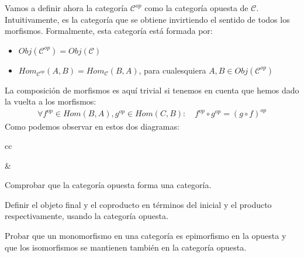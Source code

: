 \documentclass[11pt, fleqn, spanish]{book}
\newcommand{\C}{\mathcal{C} }
\begin{document}
  Vamos a definir ahora la categoría $\C^{op}$ como la categoría opuesta de $\C$. Intuitivamente,
  es la categoría que se obtiene invirtiendo el sentido de todos los morfismos. Formalmente,
  esta categoría está formada por:
  \begin{itemize}
   \item $Obj(\C^{op}) = Obj(\C)$
   \item $Hom_{\C^{op}}(A,B) = Hom_{\C}(B,A)$, para cualesquiera $A,B \in Obj(\C^{op})$
  \end{itemize}
  La composición de morfismos es aquí trivial si tenemos en cuenta que hemos dado la vuelta
  a los morfismos:
  \begin{gather*}
   \forall f^{op} \in Hom(B,A), g^{op} \in Hom(C,B):\quad f^{op} \circ g^{op} = (g \circ f)^{op}
  \end{gather*}
  Como podemos observar en estos dos diagramas:
  \begin{center}
    \begin{tabular}{cc}
      &
    \end{tabular}
  \end{center}

  \begin{exercise} 
    Comprobar que la categoría opuesta forma una categoría.
  \end{exercise}
  \begin{exercise} 
    Definir el objeto final y el coproducto en términos del inicial y el producto 
    respectivamente, usando la categoría opuesta.
  \end{exercise}
  \begin{exercise} 
    Probar que un monomorfismo en una categoría es epimorfismo en la opuesta
    y que los isomorfismos se mantienen también en la categoría opuesta.
  \end{exercise}

 
\end{document}
